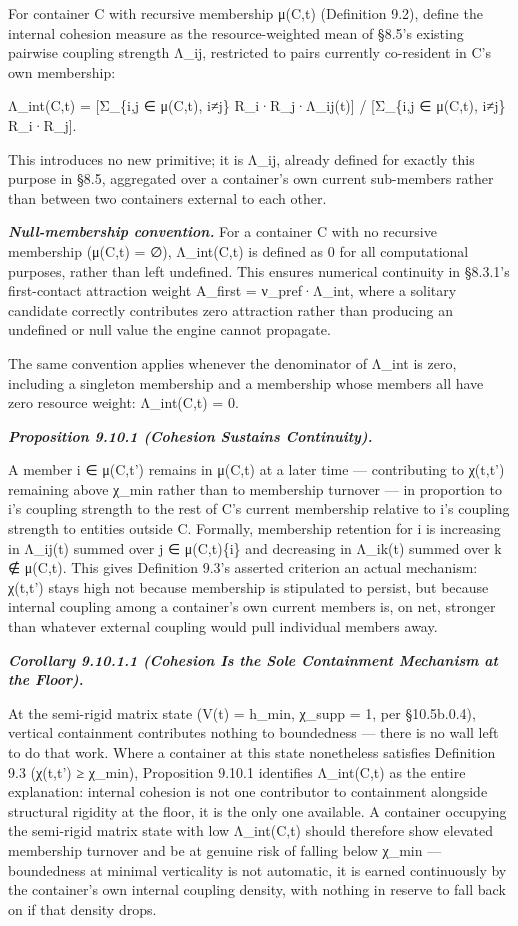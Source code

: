 \documentclass[
]{article}
\begin{document}
For container C with recursive membership μ(C,t) (Definition 9.2),
define the internal cohesion measure as the resource-weighted mean of
§8.5's existing pairwise coupling strength Λ\_ij, restricted to pairs
currently co-resident in C's own membership:

Λ\_int(C,t) = {[}Σ\_\{i,j ∈ μ(C,t), i≠j\} R\_i·R\_j·Λ\_ij(t){]} /
{[}Σ\_\{i,j ∈ μ(C,t), i≠j\} R\_i·R\_j{]}.

This introduces no new primitive; it is Λ\_ij, already defined for
exactly this purpose in §8.5, aggregated over a container's own current
sub-members rather than between two containers external to each other.

\emph{\textbf{Null-membership convention.}} For a container C with no
recursive membership (μ(C,t) = ∅), Λ\_int(C,t) is defined as 0 for all
computational purposes, rather than left undefined. This ensures
numerical continuity in §8.3.1's first-contact attraction weight
A\_first = ν\_pref·Λ\_int, where a solitary candidate correctly
contributes zero attraction rather than producing an undefined or null
value the engine cannot propagate.

The same convention applies whenever the denominator of Λ\_int is zero,
including a singleton membership and a membership whose members all have
zero resource weight: Λ\_int(C,t) = 0.

\emph{\textbf{Proposition 9.10.1 (Cohesion Sustains Continuity).}}

A member i ∈ μ(C,t') remains in μ(C,t) at a later time --- contributing
to χ(t,t') remaining above χ\_min rather than to membership turnover ---
in proportion to i's coupling strength to the rest of C's current
membership relative to i's coupling strength to entities outside C.
Formally, membership retention for i is increasing in Λ\_ij(t) summed
over j ∈ μ(C,t)\{i\} and decreasing in Λ\_ik(t) summed over k ∉ μ(C,t).
This gives Definition 9.3's asserted criterion an actual mechanism:
χ(t,t') stays high not because membership is stipulated to persist, but
because internal coupling among a container's own current members is, on
net, stronger than whatever external coupling would pull individual
members away.

\emph{\textbf{Corollary 9.10.1.1 (Cohesion Is the Sole Containment
Mechanism at the Floor).}}

At the semi-rigid matrix state (V(t) = h\_min, χ\_supp = 1, per
§10.5b.0.4), vertical containment contributes nothing to boundedness ---
there is no wall left to do that work. Where a container at this state
nonetheless satisfies Definition 9.3 (χ(t,t') ≥ χ\_min), Proposition
9.10.1 identifies Λ\_int(C,t) as the entire explanation: internal
cohesion is not one contributor to containment alongside structural
rigidity at the floor, it is the only one available. A container
occupying the semi-rigid matrix state with low Λ\_int(C,t) should
therefore show elevated membership turnover and be at genuine risk of
falling below χ\_min --- boundedness at minimal verticality is not
automatic, it is earned continuously by the container's own internal
coupling density, with nothing in reserve to fall back on if that
density drops.
\end{document}
